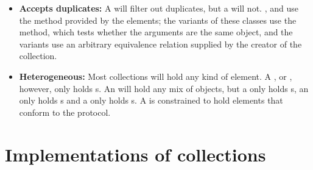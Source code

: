 \documentclass[a4paper,10pt,twoside]{book}
\begin{document}
\begin{itemize}
  \item {\bf Accepts duplicates:}
  	A  will filter out duplicates, but a  will not.
	,  and  use the \ct{=} method provided by the elements; the  variants of these classes use the \ct{==} method, which tests whether the arguments are the same object, and the  variants use an arbitrary equivalence relation supplied by the creator of the collection.

  \item {\bf Heterogeneous:}
  	Most collections will hold any kind of element.
	A ,  or , however, only holds s.
	An  will hold any mix of objects, but a  only holds s, an  only holds s and a  only holds s.
	A  is constrained to hold elements that conform to the  protocol.

\end{itemize}


\section{Implementations of collections}
\label{sec:implementation}
\end{document}

